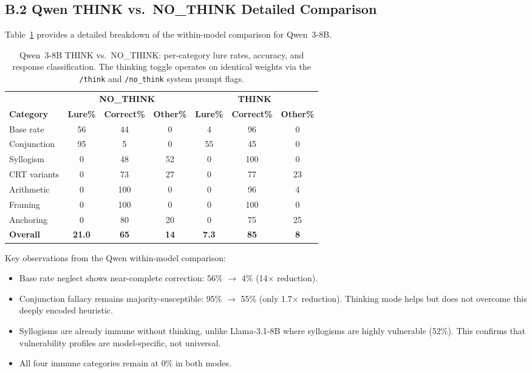 \documentclass{article}
\begin{document}
\subsection*{B.2 Qwen THINK vs.\ NO\_THINK Detailed Comparison}

Table~\ref{tab:qwen_detail} provides a detailed breakdown of the
within-model comparison for Qwen~3-8B.

\begin{table}[ht]
\centering
\caption{Qwen~3-8B THINK vs.\ NO\_THINK: per-category lure rates,
  accuracy, and response classification.  The thinking toggle operates
  on identical weights via the \texttt{/think} and
  \texttt{/no\_think} system prompt flags.}
\label{tab:qwen_detail}
\vspace{4pt}
\small
\begin{tabular}{lcccccc}
\toprule
& \multicolumn{3}{c}{\textbf{NO\_THINK}} & \multicolumn{3}{c}{\textbf{THINK}} \\
\cmidrule(lr){2-4}\cmidrule(lr){5-7}
\textbf{Category} & \textbf{Lure\%} & \textbf{Correct\%} & \textbf{Other\%} & \textbf{Lure\%} & \textbf{Correct\%} & \textbf{Other\%} \\
\midrule
Base rate    & 56 & 44 & 0  & 4  & 96 & 0  \\
Conjunction  & 95 & 5  & 0  & 55 & 45 & 0  \\
Syllogism    & 0  & 48 & 52 & 0  & 100 & 0  \\
CRT variants & 0  & 73 & 27 & 0  & 77 & 23 \\
Arithmetic   & 0  & 100 & 0  & 0  & 96 & 4  \\
Framing      & 0  & 100 & 0  & 0  & 100 & 0  \\
Anchoring    & 0  & 80 & 20 & 0  & 75 & 25 \\
\midrule
\textbf{Overall} & \textbf{21.0} & \textbf{65} & \textbf{14} & \textbf{7.3} & \textbf{85} & \textbf{8} \\
\bottomrule
\end{tabular}
\end{table}

\noindent Key observations from the Qwen within-model comparison:
\begin{itemize}[leftmargin=*,itemsep=2pt]
  \item Base rate neglect shows near-complete correction: 56\% $\to$
  4\% (14$\times$ reduction).
  \item Conjunction fallacy remains majority-susceptible: 95\% $\to$
  55\% (only 1.7$\times$ reduction).  Thinking mode helps but does not
  overcome this deeply encoded heuristic.
  \item Syllogisms are already immune without thinking, unlike
  Llama-3.1-8B where syllogisms are highly vulnerable (52\%).  This
  confirms that vulnerability profiles are model-specific, not
  universal.
  \item All four immune categories remain at 0\% in both modes.
\end{itemize}
\end{document}
